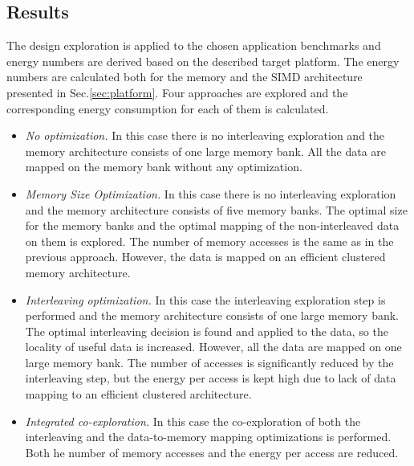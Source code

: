 \documentclass[prodmode,acmtecs]{acmsmall}
\begin{document}
\subsection{Results}
\label{sec:results}


The design exploration is applied to the chosen application benchmarks and energy numbers are derived based on the described target platform.
The energy numbers are calculated both for the memory and the SIMD architecture presented in Sec.\ref{sec:platform}.
Four approaches are explored and the corresponding energy consumption for each of them is calculated.

\begin{itemize}
\item \textit{No optimization.} 
In this case there is no interleaving exploration and the memory architecture consists of one large memory bank. All the data are mapped on the memory bank without any optimization. 
\item \textit{Memory Size Optimization.} 
In this case there is no interleaving exploration and the memory architecture consists of five memory banks.
The optimal size for the memory banks and the optimal mapping of the non-interleaved data on them is explored. 
The number of memory accesses is the same as in the previous approach.
However, the data is mapped on an efficient clustered memory architecture.
\item \textit{Interleaving optimization.} 
In this case the  interleaving exploration step is performed and the memory architecture consists of one large memory bank.
The optimal interleaving decision is found and applied to the data, so the locality of useful data is increased.
However, all the data are mapped on one large memory bank.
The number of accesses is significantly reduced by the interleaving step, but the energy per access is kept high due to lack of data mapping to an efficient clustered architecture.
\item \textit{Integrated co-exploration.} 
In this case the co-exploration of both the interleaving and the data-to-memory mapping optimizations is performed.
Both he number of memory accesses and the energy per access are reduced.
\end{itemize}
\end{document}
